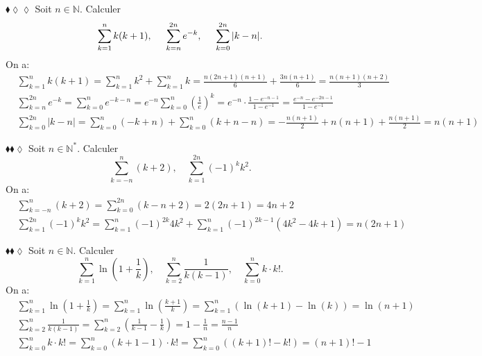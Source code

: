 \documentclass[11pt]{article}
\begin{document}
\pagebreak

\begin{exercice}{$\blacklozenge\lozenge\lozenge$}{}
    Soit $n\in\mathbb{N}$. Calculer
    \begin{equation*}
        \sum\limits^{n}_{k=1}{k(k+1)}, \hspace{0.5cm} \sum\limits^{2n}_{k=n}{e^{-k}}, \hspace{0.5cm} \sum\limits^{2n}_{k=0}{|k-n|}.
    \end{equation*}
    \tcblower
    On a:
    \begin{align*}
        &\sum\limits^n_{k=1}{k(k+1)} = \sum\limits^n_{k=1}{k^2} + \sum\limits^n_{k=1}{k} = \frac{n(2n+1)(n+1)}{6}+\frac{3n(n+1)}{6}=\frac{n(n+1)(n + 2)}{3}\\
        &\sum\limits^{2n}_{k=n}{e^{-k}} = \sum\limits^{n}_{k=0}{e^{-k-n}}=e^{-n}\sum\limits^{n}_{k=0}{(\frac{1}{e})^k}=e^{-n}\cdot\frac{1-e^{-n-1}}{1-e^{-1}}=\frac{e^{-n}-e^{-2n-1}}{1-e^{-1}}\\
        &\sum\limits^{2n}_{k=0}{|k-n|}=\sum\limits^{n}_{k=0}{(-k+n)}+\sum\limits^{n}_{k=0}{(k+n-n)}=-\frac{n(n+1)}{2}+n(n+1)+\frac{n(n+1)}{2}=n(n+1)
    \end{align*}
\end{exercice}

\begin{exercice}{$\blacklozenge\blacklozenge\lozenge$}{}
    Soit $n\in\mathbb{N}^*$. Calculer
    \begin{equation*}
        \sum\limits^{n}_{k=-n}{(k+2)}, \quad \sum\limits^{2n}_{k=1}{(-1)^kk^2}.
    \end{equation*}
    \tcblower
    On a:
    \begin{align*}
        &\sum\limits^{n}_{k=-n}{(k+2)}=\sum\limits^{2n}_{k=0}{(k-n+2)}=2(2n+1)=4n+2\\
        &\sum\limits^{2n}_{k=1}{(-1)^kk^2}=\sum\limits^{n}_{k=1}{(-1)^{2k}4k^2}+\sum\limits^{n}_{k=1}{(-1)^{2k-1}(4k^2-4k+1)}=n(2n+1)
    \end{align*}
\end{exercice}

\begin{exercice}{$\blacklozenge\blacklozenge\lozenge$}{}
    Soit $n\in\mathbb{N}$. Calculer
    \begin{equation*}
        \sum\limits^{n}_{k=1}{\ln(1+\frac{1}{k})}, \quad \sum\limits^{n}_{k=2}{\frac{1}{k(k-1)}}, \quad \sum\limits_{k=0}^{n}{k\cdot k!}.
    \end{equation*}
    \tcblower
    On a:
    \begin{align*}
        &\sum\limits^{n}_{k=1}{\ln(1+\frac{1}{k})}=\sum\limits^n_{k=1}{\ln(\frac{k+1}{k})}=\sum\limits^n_{k=1}{(\ln(k+1)-\ln(k))}=\ln(n+1)\\
        &\sum\limits^{n}_{k=2}{\frac{1}{k(k-1)}}=\sum\limits^n_{k=2}{(\frac{1}{k-1}-\frac{1}{k})}=1-\frac{1}{n}=\frac{n-1}{n}\\
        &\sum\limits_{k=0}^{n}{k\cdot k!}=\sum\limits^n_{k=0}{(k+1-1)\cdot k!}=\sum\limits^n_{k=0}{((k+1)! - k!)}=(n+1)!-1
    \end{align*}
\end{exercice}
\end{document}
